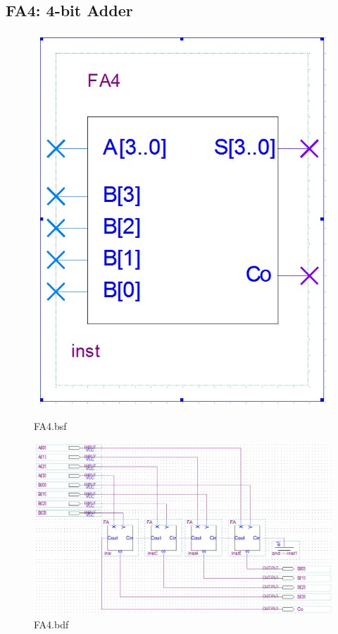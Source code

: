 \documentclass[12pt,a4paper]{article}
\begin{document}
  \subsection{FA4: 4-bit Adder}
  \begin{figure}[H]
    \centering
    \begin{subcaptionblock}{0.15\linewidth}
      \includegraphics[width=\linewidth]{Lab2_3/FA4_bsf.png}
      \caption{FA4.bsf}
    \end{subcaptionblock}
    \begin{subcaptionblock}{0.84\linewidth}
      \includegraphics[width=\linewidth]{Lab2_2/FA4_bdf.png}
      \caption{FA4.bdf}
    \end{subcaptionblock}
  \end{figure}
\end{document}
